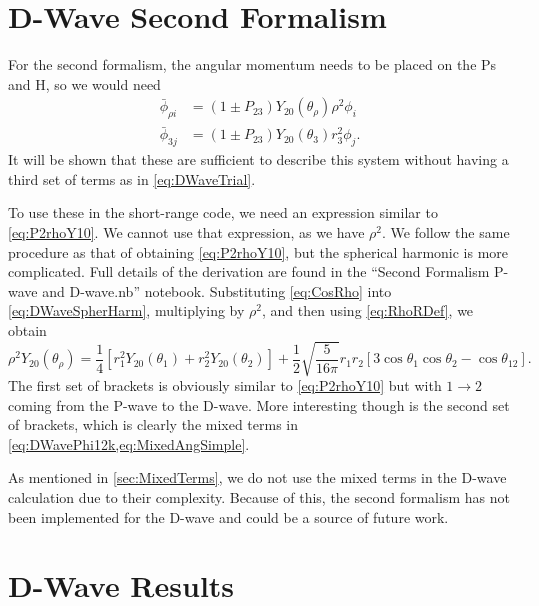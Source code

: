 \documentclass[Dissertation.tex]{subfiles}
\begin{document}


\section{D-Wave Second Formalism}
\label{sec:DSecondForm}
For the second formalism, the angular momentum needs to be placed on the Ps and H, so we would need
\begin{subequations}
\label{eq:DWave2ndPhiBar}
\begin{align}
\bar{\phi}_{\rho i} &= \left(1 \pm P_{23}\right) Y_{20}(\theta_\rho) \rho^2 \phi_i \label{eq:DWave2ndPhi1i}\\
\bar{\phi}_{3j} &= \left(1 \pm P_{23}\right) Y_{20}(\theta_3) r_3^2 \phi_j \label{eq:DWave2ndPhi2j}.
\end{align}
\end{subequations}
It will be shown that these are sufficient to describe this system without 
having a third set of terms as in \cref{eq:DWaveTrial}.

To use these in the short-range code, we need an expression similar to
\cref{eq:P2rhoY10}. We cannot use that expression, as we have $\rho^2$. We
follow the same procedure as that of obtaining \cref{eq:P2rhoY10}, but the
spherical harmonic is more complicated. Full details of the derivation are
found in the ``Second Formalism P-wave and D-wave.nb'' notebook.
Substituting \cref{eq:CosRho} into \cref{eq:DWaveSpherHarm}, multiplying by
$\rho^2$, and then using \cref{eq:RhoRDef}, we obtain
\begin{equation}
\label{eq:rhoident2}
\rho^2 Y_{20}(\theta_\rho) = \frac{1}{4} \left[r_1^2 Y_{20}(\theta_1) + r_2^2 Y_{20}(\theta_2) \right] + \frac{1}{2} \sqrt{\frac{5}{16 \pi}} 
   r_1 r_2 \left[3 \cos\theta_1 \cos\theta_2 - \cos\theta_{12} \right].
\end{equation}
The first set of brackets is obviously similar to \cref{eq:P2rhoY10} but with
$1 \to 2$ coming from the P-wave to the D-wave. More interesting though is the
second set of brackets, which is clearly the mixed terms in
\cref{eq:DWavePhi12k,eq:MixedAngSimple}.

As mentioned in \cref{sec:MixedTerms}, we do not use the mixed terms in the
D-wave calculation due to their complexity. Because of this, the second
formalism has not been implemented for the D-wave and could be a source of
future work.


\section{D-Wave Results}
\label{sec:DWaveResults}
\end{document}
